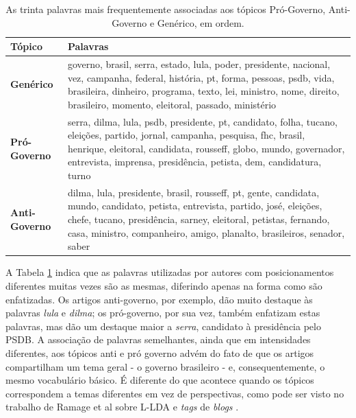 \begin{table}[h]
\centering
\begin{tabular}{| l | p{10cm} | }
\hline
\textbf{Tópico} & \textbf{Palavras} \\ \hline
\textbf{Genérico} &  governo, brasil, serra, estado, lula, poder, presidente, nacional, vez, campanha, federal, história, pt, forma, pessoas, psdb, vida, brasileira, dinheiro, programa, texto, lei, ministro, nome, direito, brasileiro, momento, eleitoral, passado, ministério \\ \hline
\textbf{Pró-Governo} & serra, dilma, lula, psdb, presidente, pt, candidato, folha, tucano, eleições, partido, jornal, campanha, pesquisa, fhc, brasil, henrique, eleitoral, candidata, rousseff, globo, mundo, governador, entrevista, imprensa, presidência, petista, dem, candidatura, turno\\ \hline
\textbf{Anti-Governo} & dilma, lula, presidente, brasil, rousseff, pt, gente, candidata, mundo, candidato, petista, entrevista, partido, josé, eleições, chefe, tucano, presidência, sarney, eleitoral, petistas, fernando, casa, ministro, companheiro, amigo, planalto, brasileiros, senador, saber \\ \hline
\end{tabular}
\label{tab:palavras}
\caption{As trinta palavras mais frequentemente associadas aos tópicos Pró-Governo, Anti-Governo e Genérico, em ordem.}
\end{table}


A Tabela \ref{tab:palavras} indica que as palavras utilizadas por autores com posicionamentos diferentes muitas vezes são as mesmas, diferindo apenas na forma como são enfatizadas. Os artigos anti-governo, por exemplo, dão muito destaque às palavras \emph{lula} e \emph{dilma}; os pró-governo, por sua vez, também enfatizam estas palavras, mas dão um destaque maior a \emph{serra}, candidato à presidência pelo PSDB. A associação de palavras semelhantes, ainda que em intensidades diferentes, aos tópicos anti e pró governo advém do fato de que os artigos compartilham um tema geral - o governo brasileiro - e, consequentemente, o mesmo vocabulário básico. É diferente do que acontece quando os tópicos correspondem a temas diferentes em vez de perspectivas, como pode ser visto no trabalho de Ramage et al sobre L-LDA e \emph{tags} de \emph{blogs} \cite{llda}.

